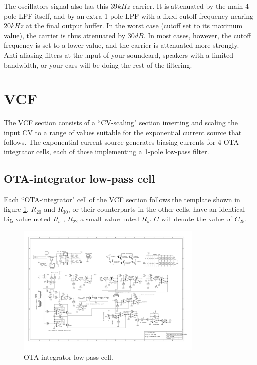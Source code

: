 \documentclass[a4paper,11pt]{article}
\begin{document}
The oscillators signal also has this $39kHz$ carrier. It is attenuated by the main 4-pole LPF itself, and by an extra 1-pole LPF with a fixed cutoff frequency nearing $20kHz$ at the final output buffer. In the worst case (cutoff set to its maximum value), the carrier is thus attenuated by $30dB$. In most cases, however, the cutoff frequency is set to a lower value, and the carrier is attenuated more strongly. Anti-aliasing filters at the input of your soundcard, speakers with a limited bandwidth, or your ears will be doing the rest of the filtering.

\section{VCF}
\label{sec:vcf}

The VCF section consists of a ``CV-scaling" section inverting and scaling the input CV to a range of values suitable for the exponential current source that follows. The exponential current source generates biasing currents for 4 OTA-integrator cells, each of those implementing a 1-pole low-pass filter.

\subsection{OTA-integrator low-pass cell}
\label{sec:otac}

Each ``OTA-integrator" cell of the VCF section follows the template shown in figure \ref{fig:otac}. $R_{20}$ and $R_{30}$, or their counterparts in the other cells, have an identical big value noted $R_b$ ; $R_{22}$ a small value noted $R_s$. $C$ will denote the value of $C_{25}$.

\begin{figure}
\centering
\includegraphics[width=0.8\textwidth]{smr4_otac_cell.pdf}
\caption{OTA-integrator low-pass cell.}
\label{fig:otac}
\end{figure}
\end{document}
